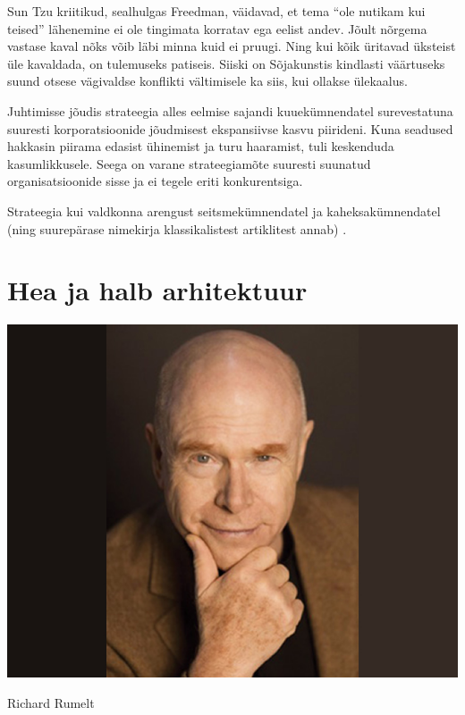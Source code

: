 \documentclass{tufte-book}
\begin{document}
Sun Tzu kriitikud, sealhulgas Freedman, väidavad, et tema \enquote{ole nutikam kui teised} lähenemine ei ole tingimata korratav ega eelist andev. Jõult nõrgema vastase kaval nõks võib läbi minna kuid ei pruugi. Ning kui kõik üritavad üksteist üle kavaldada, on tulemuseks patiseis. Siiski on Sõjakunstis kindlasti väärtuseks suund otsese vägivaldse konflikti vältimisele ka siis, kui ollakse ülekaalus.

Juhtimisse jõudis strateegia alles eelmise sajandi kuuekümnendatel surevestatuna suuresti korporatsioonide jõudmisest ekspansiivse kasvu piirideni. Kuna seadused hakkasin piirama edasist ühinemist ja turu haaramist, tuli keskenduda kasumlikkusele. Seega on varane strateegiamõte suuresti suunatud organisatsioonide sisse ja ei tegele eriti konkurentsiga. 

Strateegia kui valdkonna arengust seitsmekümnendatel ja kaheksakümnendatel (ning suurepärase nimekirja klassikalistest artiklitest annab) \cite{rumelt1991strategic}.

\section{Hea ja halb arhitektuur}
\begin{marginfigure}
	\begin{center}
		\includegraphics[trim={5cm 0 5cm 0},clip,width=.7\linewidth]{richard_rumelt.jpg}
		\caption{Richard Rumelt}
		\label{fig:rumelt}
	\end{center}
\end{marginfigure}
\end{document}
